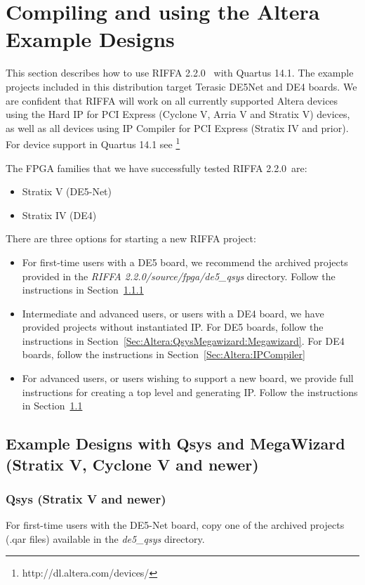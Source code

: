 \documentclass{refrep}
\newcommand{\QuartusVer}{14.1}
\newcommand{\RIFFAVer}{2.2.0}
\newcommand{\Directory}[1]{\textit{#1}}
\begin{document}
\pagebreak
\chapter{Compiling and using the Altera Example Designs}
\label{Chap:Altera}
This section describes how to use RIFFA \RIFFAVer~ with Quartus \QuartusVer. The
example projects included in this distribution target Terasic DE5Net and DE4
boards. We are confident that RIFFA will work on all currently supported Altera
devices using the Hard IP for PCI Express (Cyclone V, Arria V and Stratix V)
devices, as well as all devices using IP Compiler for PCI Express (Stratix IV
and prior). For device support in Quartus \QuartusVer
see \footnote{http://dl.altera.com/devices/}

The FPGA families that we have successfully tested RIFFA \RIFFAVer~are:
\begin{itemize}
\item Stratix V (DE5-Net)
\item Stratix IV (DE4)
\end{itemize}
There are three options for starting a new RIFFA project:
\begin{itemize}
\item For first-time users with a DE5 board, we recommend the archived projects
  provided in the \Directory{RIFFA \RIFFAVer/source/fpga/de5\_qsys} directory. Follow the
  instructions in Section~\ref{Sec:Altera:QsysMegawizard:Qsys}
\item Intermediate and advanced users, or users with a DE4 board, we have
  provided projects without instantiated IP. For DE5 boards, follow the
  instructions in Section~\ref{Sec:Altera:QsysMegawizard:Megawizard}. For DE4 boards, follow
  the instructions in Section~\ref{Sec:Altera:IPCompiler}
\item For advanced users, or users wishing to support a new board, we provide
  full instructions for creating a top level and generating IP. Follow the
  instructions in Section~\ref{Sec:Altera:QsysMegawizard}
\end{itemize}

\section{Example Designs with Qsys and MegaWizard (Stratix V, Cyclone V and newer)}
\label{Sec:Altera:QsysMegawizard}
\subsection{Qsys (Stratix V and newer)}
\label{Sec:Altera:QsysMegawizard:Qsys}
For first-time users with the DE5-Net board, copy one of the archived projects
(.qar files) available in the \Directory{de5\_qsys} directory.
\end{document}
